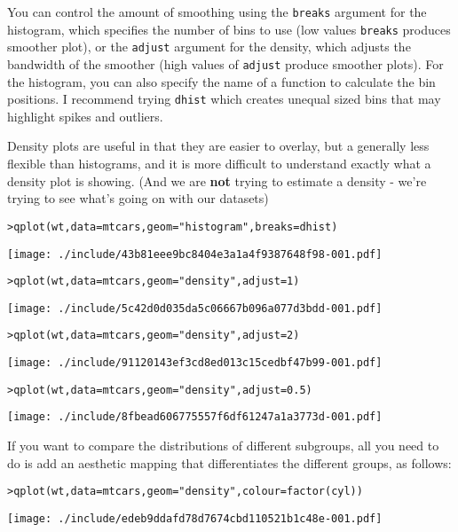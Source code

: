 You can control the amount of smoothing using the {\tt breaks} argument for the histogram, which specifies the number of bins to use (low values {\tt breaks} produces smoother plot), or the {\tt adjust} argument for the density, which adjusts the bandwidth of the smoother (high values of {\tt adjust} produce smoother plots).  For the histogram, you can also specify the name of a function to calculate the bin positions.  I recommend trying {\tt dhist} which creates unequal sized bins that may highlight spikes and outliers.

Density plots are useful in that they are easier to overlay, but a generally less flexible than histograms, and it is more difficult to understand exactly what a density plot is showing.  (And we are {\bf not} trying to estimate a density - we're trying to see what's going on with our datasets)

\begin{alltt}
> qplot(wt, data = mtcars, geom = "histogram", breaks = dhist)
\end{alltt}
\texttt{[image: ./include/43b81eee9bc8404e3a1a4f9387648f98-001.pdf]}
\begin{alltt}

> qplot(wt, data = mtcars, geom = "density", adjust = 1)
\end{alltt}
\texttt{[image: ./include/5c42d0d035da5c06667b096a077d3bdd-001.pdf]}
\begin{alltt}

> qplot(wt, data = mtcars, geom = "density", adjust = 2)
\end{alltt}
\texttt{[image: ./include/91120143ef3cd8ed013c15cedbf47b99-001.pdf]}
\begin{alltt}

> qplot(wt, data = mtcars, geom = "density", adjust = 0.5)
\end{alltt}
\texttt{[image: ./include/8fbead606775557f6df61247a1a3773d-001.pdf]}
\begin{alltt}

\end{alltt}

If you want to compare the distributions of different subgroups, all you need to do is add an aesthetic mapping that differentiates the different groups, as follows:

\begin{alltt}
> qplot(wt, data=mtcars, geom="density", colour=factor(cyl))
\end{alltt}
\texttt{[image: ./include/edeb9ddafd78d7674cbd110521b1c48e-001.pdf]}
\begin{alltt}

\end{alltt}

